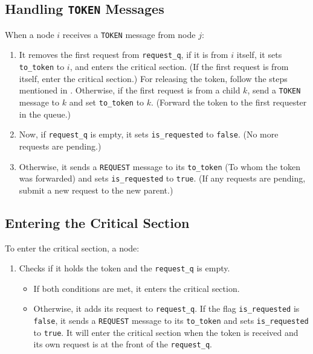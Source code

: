 \subsection{Handling \texttt{TOKEN} Messages}
When a node $i$ receives a \texttt{TOKEN} message from node $j$:
\begin{enumerate}
    \item It removes the first request from \texttt{request\_q}, if it is from $i$ itself, it sets \texttt{to\_token} to $i$, and enters the critical section. (If the first request is from itself, enter the critical section.) For releasing the token, follow the steps mentioned in . Otherwise, if the first request is from a child \(k\), send a \texttt{TOKEN} message to \(k\) and set \texttt{to\_token} to \(k\). (Forward the token to the first requester in the queue.)
    \item Now, if \texttt{request\_q} is empty, it sets \texttt{is\_requested} to \texttt{false}. (No more requests are pending.)
    \item Otherwise, it sends a \texttt{REQUEST} message to its \texttt{to\_token} (To whom the token was forwarded) and sets \texttt{is\_requested} to \texttt{true}. (If any requests are pending, submit a new request to the new parent.)
\end{enumerate}

\subsection{Entering the Critical Section}
To enter the critical section, a node:
\begin{enumerate}
    \item Checks if it holds the token and the \texttt{request\_q} is empty.
        \begin{itemize}
            \item If both conditions are met, it enters the critical section.
            \item Otherwise, it adds its request to \texttt{request\_q}. If the flag \texttt{is\_requested} is \texttt{false}, it sends a \texttt{REQUEST} message to its \texttt{to\_token} and sets \texttt{is\_requested} to \texttt{true}. It will enter the critical section when the token is received and its own request is at the front of the \texttt{request\_q}.
        \end{itemize}
\end{enumerate}

